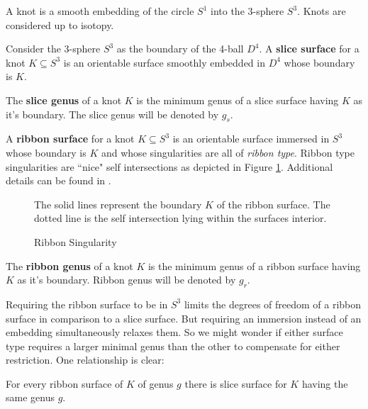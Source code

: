 \documentclass[12pt]{thesis}
\begin{document}
\begin{definition}
    A knot is a smooth embedding of the circle $S^{1}$ into the 3-sphere $S^{3}$.
    Knots are considered up to isotopy.
\end{definition}

\begin{definition}
Consider the 3-sphere $S^{3}$ as the boundary of the 4-ball $D^{4}$.
A \textbf{slice surface} for a knot $K \subseteq S^{3}$
is an orientable surface smoothly embedded in $D^{4}$ 
whose boundary is $K$.
\end{definition}


\begin{definition}
    The \textbf{slice genus} of a knot $K$ is the minimum genus
    of a slice surface having $K$ as it's boundary.
    The slice genus will be denoted by $g_{s}$.
\end{definition}

\begin{definition}
    A \textbf{ribbon surface} for a knot $K \subseteq S^{3}$
    is an orientable surface immersed in $S^{3}$
    whose boundary is $K$
    and whose singularities are all of \textit{ribbon type}.
    Ribbon type singularities are ``nice" self intersections
    as depicted in Figure \ref{fig:ribbon-singularity}.
    Additional details can be found in \cite{on-braided-surfaces}.
\end{definition}

\begin{figure}[h]
    \centering
    \def\svgwidth{6cm}
    
    \caption{Ribbon Singularity}

    The solid lines represent the boundary $K$
    of the ribbon surface. The dotted line
    is the self intersection lying within the
    surfaces interior.
    \label{fig:ribbon-singularity}
\end{figure}


\begin{definition}
    The \textbf{ribbon genus} of a knot $K$ is the minimum genus
    of a ribbon surface having $K$ as it's boundary.
    Ribbon genus will be denoted by $g_{r}$.
\end{definition}

Requiring the ribbon surface to be in $S^{3}$
limits the degrees of freedom of a ribbon surface in comparison to a slice surface.
But requiring an immersion instead of an embedding simultaneously relaxes them.
So we might wonder if either surface type requires a larger minimal genus than the other
to compensate for either restriction.
One relationship is clear:
\begin{proposition}
    For every ribbon surface of $K$ of genus $g$
    there is slice surface for $K$ having the same genus $g$.
\end{proposition}
\end{document}
